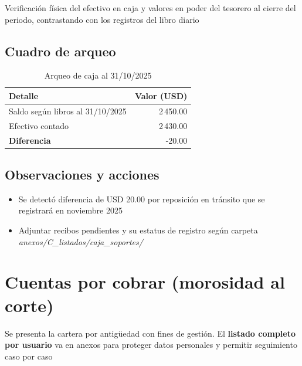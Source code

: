 Verificación física del efectivo en caja y valores en poder del tesorero al cierre del periodo, contrastando con los registros del libro diario

\subsection*{Cuadro de arqueo}
\begin{table}[H]
\centering
\caption{Arqueo de caja al 31/10/2025}
\label{tab:arqueo_caja}
\begin{singlespace}
\begin{tabular}{p{9cm} r}
\toprule
\textbf{Detalle} & \textbf{Valor (USD)} \\
\midrule
Saldo según libros al 31/10/2025 & 2\,450.00 \\
Efectivo contado & 2\,430.00 \\
\midrule
\textbf{Diferencia} & -20.00 \\
\bottomrule
\end{tabular}
\end{singlespace}
\end{table}

\subsection*{Observaciones y acciones}
\begin{itemize}
  \item Se detectó diferencia de USD 20.00 por reposición en tránsito que se registrará en noviembre 2025
  \item Adjuntar recibos pendientes y su estatus de registro según carpeta \emph{anexos/C\_listados/caja\_soportes/}
\end{itemize}

% 

\section{Cuentas por cobrar (morosidad al corte)}
\label{sec:cuentas_por_cobrar}

Se presenta la cartera por antigüedad con fines de gestión. El \textbf{listado completo por usuario} va en anexos para proteger datos personales y permitir seguimiento caso por caso

